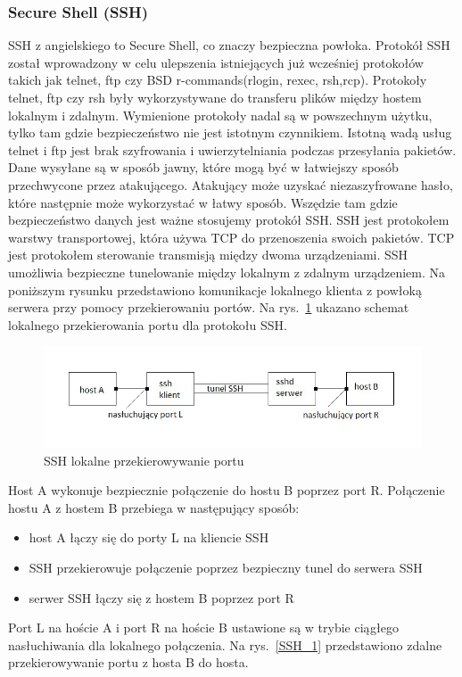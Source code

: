\documentclass[12p]{article}
\begin{document}
\subsubsection{Secure Shell (SSH)}
\quad SSH z angielskiego to Secure Shell, co znaczy bezpieczna powłoka. Protokół SSH został wprowadzony w celu ulepszenia istniejących już wcześniej protokołów takich jak telnet, ftp czy BSD r-commands(rlogin, rexec, rsh,rcp). Protokoły telnet, ftp czy rsh były wykorzystywane do transferu plików między hostem lokalnym i zdalnym. Wymienione protokoły nadal są w powszechnym użytku, tylko tam gdzie bezpieczeństwo nie jest istotnym czynnikiem. Istotną wadą usług telnet i ftp jest brak szyfrowania i uwierzytelniania podczas przesyłania pakietów. Dane wysyłane są w sposób jawny, które mogą być w łatwiejszy sposób przechwycone przez atakującego. Atakujący może uzyskać niezaszyfrowane hasło, które następnie może wykorzystać w łatwy sposób. Wszędzie tam gdzie bezpieczeństwo danych jest ważne stosujemy protokół SSH. 
\quad SSH jest protokołem warstwy transportowej, która używa TCP do przenoszenia swoich pakietów. TCP jest protokołem sterowanie transmisją między dwoma urządzeniami. SSH umożliwia bezpieczne tunelowanie między lokalnym z zdalnym urządzeniem. Na poniższym rysunku przedstawiono komunikacje lokalnego klienta z powłoką serwera przy pomocy przekierowaniu portów. Na rys.~\ref{SSH} ukazano schemat lokalnego przekierowania portu dla protokołu SSH.
\begin{figure}[h]
\centering
\includegraphics[width=12cm]{przekierowywanie_lokalne_SSH.jpg}
\caption{SSH lokalne przekierowywanie portu}\label{SSH}
\end{figure}

Host A wykonuje bezpiecznie połączenie do hostu B poprzez port R. Połączenie hostu A z hostem B przebiega w następujący sposób:
\begin{itemize}
\item host A łączy się do porty L na kliencie SSH
\item SSH przekierowuje połączenie poprzez bezpieczny tunel do serwera SSH
\item serwer SSH łączy się z hostem B poprzez port R
\end{itemize}
\newpage Port L na hoście A i port R na hoście B ustawione są w trybie ciągłego nasłuchiwania dla lokalnego połączenia. Na rys.~\ref{SSH_1} przedstawiono zdalne przekierowywanie portu z hosta B do hosta.
 
\end{document}
